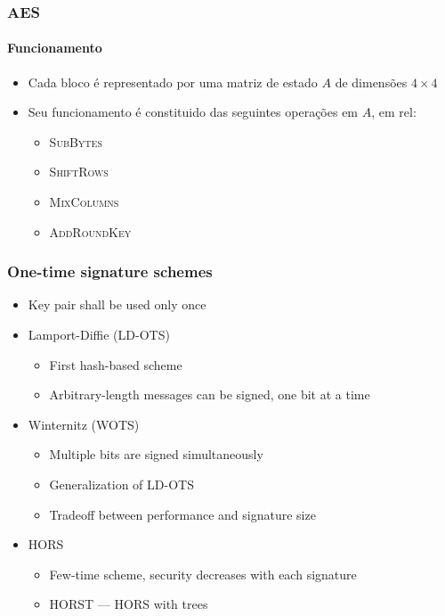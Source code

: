 \documentclass[12pt]{beamer}
\begin{document}
\begin{frame}
    \frametitle{AES}
    \framesubtitle{Funcionamento}
    \begin{itemize}
        \item Cada bloco é representado por uma matriz de estado $A$ de dimensões $4 \times 4$
        \item Seu funcionamento é constituido das seguintes operações em $A$, em rel:
        \begin{itemize}
            \item\textsc{SubBytes}
            \item\textsc{ShiftRows}
            \item\textsc{MixColumns}
            \item\textsc{AddRoundKey}
        \end{itemize}


    \end{itemize}
    
\end{frame}

\begin{frame}
  \frametitle{One-time signature schemes}
  \begin{itemize}
    \item Key pair shall be used only once
    \item Lamport-Diffie (LD-OTS)
    \begin{itemize}
      \item First hash-based scheme
      \item Arbitrary-length messages can be signed, one bit at a time
    \end{itemize}
    \item Winternitz (WOTS)
    \begin{itemize}
      \item Multiple bits are signed simultaneously
      \item Generalization of LD-OTS
      \item Tradeoff between performance and signature size
    \end{itemize}
    \item HORS
    \begin{itemize}
      \item Few-time scheme, security decreases with each signature
      \item HORST --- HORS with trees
    \end{itemize}
  \end{itemize}
\end{frame}
\end{document}
